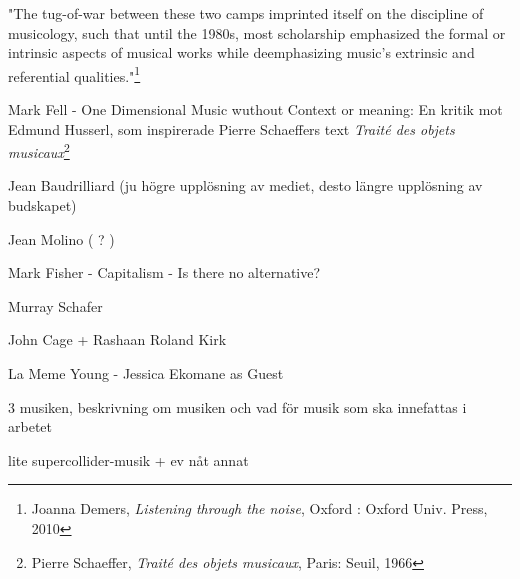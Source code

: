 \documentclass{article}
\begin{document}
	"The tug-of-war between these two camps imprinted itself on the discipline of musicology, such that until
	the 1980s, most scholarship emphasized the formal or intrinsic aspects of musical works while
	deemphasizing music’s extrinsic and referential qualities."\footnote{Joanna Demers, \emph{Listening
	through the noise}, Oxford : Oxford Univ. Press, 2010}

Mark Fell - One Dimensional Music wuthout Context or meaning:
	En kritik mot Edmund Husserl, som inspirerade Pierre Schaeffers text \emph{Traité des objets
	musicaux}\footnote{Pierre Schaeffer, \emph{Traité des objets musicaux}, Paris: Seuil, 1966}


Jean Baudrilliard (ju högre upplösning av mediet, desto längre upplösning av budskapet)

Jean Molino ( ? )

Mark Fisher - Capitalism - Is there no alternative?

Murray Schafer



John Cage + Rashaan Roland Kirk

La Meme Young - Jessica Ekomane as Guest


3 musiken, beskrivning om musiken och vad för musik som ska innefattas i arbetet

 lite supercollider-musik + ev nåt annat
\end{document}
